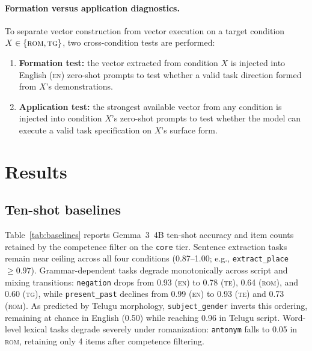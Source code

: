 \documentclass[11pt]{article}
\newcommand{\cond}[1]{\textsc{#1}}
\begin{document}
\paragraph{Formation versus application diagnostics.}
To separate vector construction from vector execution on a target condition
$X \in \{\cond{rom}, \cond{tg}\}$, two cross-condition tests are performed:
\begin{enumerate}
  \item \textbf{Formation test:} the vector extracted from condition $X$ is
    injected into English (\cond{en}) zero-shot prompts to test whether a
    valid task direction formed from $X$'s demonstrations.
  \item \textbf{Application test:} the strongest available vector from any
    condition is injected into condition $X$'s zero-shot prompts to test
    whether the model can execute a valid task specification on $X$'s surface
    form.
\end{enumerate}

\section{Results}

\subsection{Ten-shot baselines}
\label{sec:baselines}

Table~\ref{tab:baselines} reports Gemma~3~4B ten-shot accuracy and item counts
retained by the competence filter on the \texttt{core} tier. Sentence
extraction tasks remain near ceiling across all four conditions (0.87--1.00;
e.g., \texttt{extract\_place} $\ge 0.97$). Grammar-dependent tasks degrade
monotonically across script and mixing transitions: \texttt{negation} drops
from 0.93 (\cond{en}) to 0.78 (\cond{te}), 0.64 (\cond{rom}), and 0.60
(\cond{tg}), while \texttt{present\_past} declines from 0.99 (\cond{en}) to
0.93 (\cond{te}) and 0.73 (\cond{rom}). As predicted by Telugu morphology,
\texttt{subject\_gender} inverts this ordering, remaining at chance in English
(0.50) while reaching 0.96 in Telugu script. Word-level lexical tasks degrade
severely under romanization: \texttt{antonym} falls to 0.05 in \cond{rom},
retaining only 4 items after competence filtering.

\begin{table}[t]
\centering
\small
\caption{Ten-shot baseline accuracy and competence-filtered item counts
  (\texttt{core} tier, Gemma~3~4B). Items passing the competence filter form
  the evaluation pool for function vector intervention.}
\label{tab:baselines}
\end{table}
\end{document}
